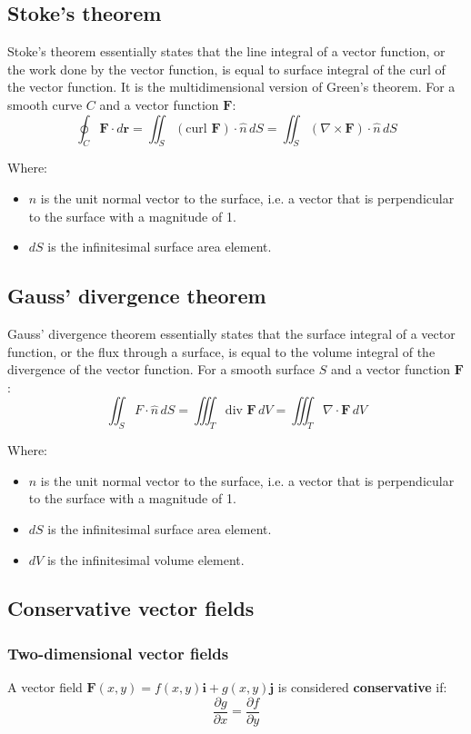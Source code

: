 \documentclass[11pt]{article}
\begin{document}
\subsection{Stoke's theorem}
\label{sec:org6da9ce2}
Stoke's theorem essentially states that the line integral of a vector function, or the work done by the vector function, is equal to surface integral of the curl of the vector function. It is the multidimensional version of Green's theorem.
For a smooth curve \(C\) and a vector function \(\boldsymbol{F}\):
\[\oint_C \boldsymbol{F} \cdot d \boldsymbol{r} = \iint_S (\text{curl } \boldsymbol{F}) \cdot \hat{n} \, dS = \iint_S (\nabla \times \boldsymbol{F}) \cdot \hat{n} \, dS\]

Where:
\begin{itemize}
\item \(\hat{n}\) is the unit normal vector to the surface, i.e. a vector that is perpendicular to the surface with a magnitude of 1.
\item \(dS\) is the infinitesimal surface area element.
\end{itemize}

\subsection{Gauss' divergence theorem}
\label{sec:org222b555}
Gauss' divergence theorem essentially states that the surface integral of a vector function, or the flux through a surface, is equal to the volume integral of the divergence of the vector function.
For a smooth surface \(S\) and a vector function \(\boldsymbol{F}\):
\[\iint_S F \cdot \hat{n} \, dS = \iiint_T \text{div } \boldsymbol{F} \, dV = \iiint_T \nabla \cdot \boldsymbol{F} \, dV\]

Where:
\begin{itemize}
\item \(\hat{n}\) is the unit normal vector to the surface, i.e. a vector that is perpendicular to the surface with a magnitude of 1.
\item \(dS\) is the infinitesimal surface area element.
\item \(dV\) is the infinitesimal volume element.
\end{itemize}

\subsection{Conservative vector fields}
\label{sec:org765cc2c}

\subsubsection{Two-dimensional vector fields}
\label{sec:orgdf899b0}
A vector field \(\boldsymbol{F} (x, y) = f(x, y) \boldsymbol{i} + g(x, y) \boldsymbol{j}\) is considered \textbf{conservative} if:
\[\frac{\partial g}{\partial x} = \frac{\partial f}{\partial y}\]
\end{document}
